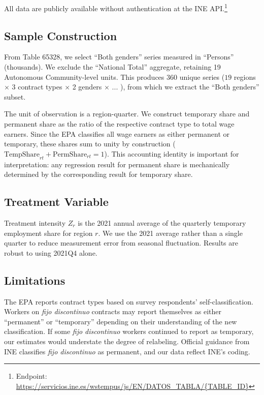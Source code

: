 \documentclass[12pt]{article}
\begin{document}
All data are publicly available without authentication at the INE API.\footnote{Endpoint: \url{https://servicios.ine.es/wstempus/js/EN/DATOS_TABLA/\{TABLE_ID\}}}

\subsection{Sample Construction}

From Table 65328, we select ``Both genders'' series measured in ``Persons'' (thousands). We exclude the ``National Total'' aggregate, retaining 19 Autonomous Community-level units. This produces 360 unique series ($19$ regions $\times$ 3 contract types $\times$ 2 genders $\times$ ... ), from which we extract the ``Both genders'' subset.

The unit of observation is a region-quarter. We construct temporary share and permanent share as the ratio of the respective contract type to total wage earners. Since the EPA classifies all wage earners as either permanent or temporary, these shares sum to unity by construction ($\text{TempShare}_{rt} + \text{PermShare}_{rt} = 1$). This accounting identity is important for interpretation: any regression result for permanent share is mechanically determined by the corresponding result for temporary share.

\subsection{Treatment Variable}

Treatment intensity $Z_r$ is the 2021 annual average of the quarterly temporary employment share for region $r$. We use the 2021 average rather than a single quarter to reduce measurement error from seasonal fluctuation. Results are robust to using 2021Q4 alone.

\subsection{Limitations}

The EPA reports contract types based on survey respondents' self-classification. Workers on \emph{fijo discontinuo} contracts may report themselves as either ``permanent'' or ``temporary'' depending on their understanding of the new classification. If some \emph{fijo discontinuo} workers continued to report as temporary, our estimates would understate the degree of relabeling. Official guidance from INE classifies \emph{fijo discontinuo} as permanent, and our data reflect INE's coding.
\end{document}
